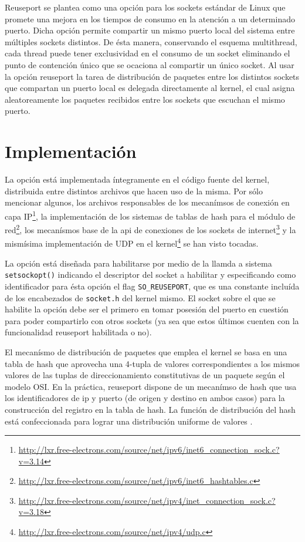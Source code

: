 Reuseport se plantea como una opción para los sockets estándar de Linux que promete una mejora en los tiempos de consumo en la atención a un determinado puerto. Dicha opción permite compartir un mismo puerto local del sistema entre múltiples sockets distintos. De ésta manera, conservando el esquema multithread, cada thread puede tener exclusividad en el consumo de un socket eliminando el punto de contención único que se ocaciona al compartir un único socket. Al usar la opción reuseport la tarea de distribución de paquetes entre los distintos sockets que compartan un puerto local es delegada directamente al kernel, el cual asigna aleatoreamente los paquetes recibidos entre los sockets que escuchan el mismo puerto.

\section{Implementación}
La opción está implementada íntegramente en el código fuente del kernel, distribuida entre distintos archivos que hacen uso de la misma. Por sólo mencionar algunos, los archivos responsables de los mecanímsos de conexión en capa IP\footnote{\url{http://lxr.free-electrons.com/source/net/ipv6/inet6_connection_sock.c?v=3.14}}, la implementación de los sistemas de tablas de hash para el módulo de red\footnote{\url{http://lxr.free-electrons.com/source/net/ipv6/inet6_hashtables.c}}, los mecanísmos base de la api de conexiones de los sockets de internet\footnote{\url{http://lxr.free-electrons.com/source/net/ipv4/inet_connection_sock.c?v=3.18}} y la mismísima implementación de UDP en el kernel\footnote{\url{http://lxr.free-electrons.com/source/net/ipv4/udp.c}} se han visto tocadas.

La opción está diseñada para habilitarse por medio de la llamda a sistema \verb=setsockopt()= indicando el descriptor del socket a habilitar y especificando como identificador para ésta opción el flag \verb=SO_REUSEPORT=, que es una constante incluída de los encabezados de \verb=socket.h= del kernel mismo. El socket sobre el que se habilite la opción debe ser el primero en tomar posesión del puerto en cuestión para poder compartirlo con otros sockets (ya sea que estos últimos cuenten con la funcionalidad reuseport habilitada o no).

El mecanísmo de distribución de paquetes que emplea el kernel se basa en una tabla de hash que aprovecha una 4-tupla de valores correspondientes a los mismos valores de las tuplas de direccionamiento constitutivas de un paquete según el modelo OSI. En la práctica, reuseport dispone de un mecanímso de hash que usa los identificadores de ip y puerto (de origen y destino en ambos casos) para la construcción del registro en la tabla de hash. La función de distribución del hash está confeccionada para lograr una distribución uniforme de valores \cite{article:reuseport}.


